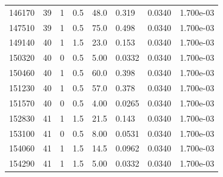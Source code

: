 \documentclass[preview]{standalone}
\begin{document}
{{{{{\begin{tabular}{L{1.2cm}C{1.2cm} C{0.3cm}C{0.5cm} C{1.4cm}C{1.4cm} C{1.4cm}C{1.4cm}}
  146170  &    39  & 1     & 0.5 &  48.0  & 0.319  & 0.0340 &  1.700e-03   \\ 
  147510  &    39  & 1     & 0.5 &  75.0  & 0.498  & 0.0340 &  1.700e-03   \\ 
  149140  &    40  & 1     & 1.5 &  23.0  & 0.153  & 0.0340 &  1.700e-03   \\ 
  150320  &    40  & 0     & 0.5 &  5.00  & 0.0332  & 0.0340 &  1.700e-03   \\ 
  150460  &    40  & 1     & 0.5 &  60.0  & 0.398  & 0.0340 &  1.700e-03   \\ 
  151230  &    40  & 1     & 0.5 &  57.0  & 0.378  & 0.0340 &  1.700e-03   \\ 
  151570  &    40  & 0     & 0.5 &  4.00  & 0.0265  & 0.0340 &  1.700e-03   \\ 
  152830  &    41  & 1     & 1.5 &  21.5  & 0.143  & 0.0340 &  1.700e-03   \\ 
  153100  &    41  & 0     & 0.5 &  8.00  & 0.0531  & 0.0340 &  1.700e-03   \\ 
  154060  &    41  & 1     & 1.5 &  14.5  & 0.0962  & 0.0340 &  1.700e-03   \\ 
  154290  &    41  & 1     & 1.5 &  5.00  & 0.0332  & 0.0340 &  1.700e-03   \\ 
\hline 
\end{tabular} 

}}}}}
\end{document}
